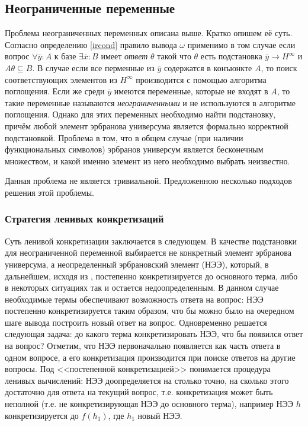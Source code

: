 \subsection{Неограниченные переменные}
Проблема неограниченных переменных описана выше. Кратко опишем её суть. Согласно определению \ref{ircond} правило вывода $\omega$ применимо в том случае если вопрос $\forall \bar{y}\colon A$ к базе $\exists \bar{x}\colon B$ имеет {\em ответ} $\theta$  такой что $\theta$ есть подстановка $\bar{y} \rightarrow H^{\infty}$ и $A\theta \subseteq B$. В случае если все перменные из $\bar{y}$ содержатся в конъюнкте $A$, то поиск соответствующих элементов из $H^{\infty}$ производится с помощью алгоритма поглощения. Если же среди $\bar{y}$ имеются переменные, которые не входят в $A$, то такие переменные называются \emph{неограниченными} и не используются в алгоритме поглощения. Однако для этих переменных необходимо найти подстановку, причём любой элемент эрбранова универсума является формально корректной подстановкой. Проблема в том, что в общем случае (при наличии функциональных символов) эрбранов универсум является бесконечным множеством, и какой именно элемент из него необходимо выбрать неизвестно.

Данная проблема не является тривиальной. Предложенною несколько подходов решения этой проблемы.

\subsubsection{Стратегия ленивых конкретизаций}
Суть ленивой конкретизации заключается в следующем. В качестве подстановки для неограниченной переменной выбирается не конкретный элемент эрбранова универсума, а неопределенный эрбрановский элемент (НЭЭ), который, в дальнейшем, исходя из , постепенно конкретизируется до основного терма, либо в некоторых ситуациях так и остается недоопределенным. В данном случае необходимые термы обеспечивают возможность ответа на вопрос: НЭЭ постепенно конкретизируется таким образом, что бы можно было на очередном шаге вывода построить новый ответ на   вопрос. Одновременно решается следующая задача: до какого терма конкретизировать НЭЭ, что бы появился ответ на вопрос? Отметим, что НЭЭ первоначально появляется как часть ответа в одном вопросе, а его конкретизация производится при поиске ответов на другие вопросы. Под <<постепенной конкретизацией>> понимается процедура ленивых вычислений: НЭЭ доопределяется на столько точно, на сколько этого достаточно для ответа на текущий вопрос, т.е. конкретизация может быть неполной (т.е. не конкретизирующая НЭЭ до основного терма), например НЭЭ $h$ конкретизируется до $f(h_1)$, где $h_1$ новый НЭЭ.

